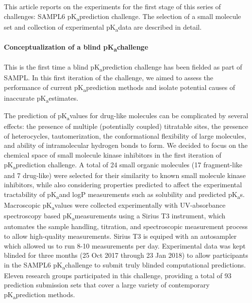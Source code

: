 \documentclass[9pt,lineno]{elife}
\newcommand{\pKa}{pK\textsubscript{a}}
\begin{document}
This article reports on the experiments for the first stage of this series of challenges: SAMPL6 \pKa prediction challenge. The selection of a small molecule set and collection of experimental \pKa data are described in detail.

\paragraph{Conceptualization of a blind \pKa challenge}

This is the first time a blind \pKa prediction challenge has been fielded as part of SAMPL. 
In this first iteration of the challenge, we aimed to assess the performance of current \pKa prediction methods and isolate potential causes of inaccurate \pKa estimates.

The prediction of \pKa values for drug-like molecules can be complicated by several effects: the presence of multiple (potentially coupled) titratable sites, the presence of heterocycles, tautomerization, the conformational flexibility of large molecules, and ability of intramolecular hydrogen bonds to form. 
We decided to focus on the chemical space of small molecule kinase inhibitors in the first iteration of \pKa prediction challenge. 
A total of 24 small organic molecules (17 fragment-like and 7 drug-like) were selected for their similarity to known small molecule kinase inhibitors, while also considering properties predicted to affect the experimental tractability of \pKa and logP measurements such as solubility and predicted \pKa s. 
Macroscopic \pKa values were collected experimentally with UV-absorbance spectroscopy based \pKa measurements using a Sirius T3 instrument, which automates the sample handling, titration, and spectroscopic measurement process to allow high-quality measurements. Sirius T3 is equiped with an autosampler which allowed us to run 8-10 measurements per day.
Experimental data was kept blinded for three months (25 Oct 2017 through 23 Jan 2018) to allow participants in the SAMPL6 \pKa challenge to submit truly blinded computational predictions. 
Eleven research groups participated in this challenge, providing a total of 93 prediction submission sets that cover a large variety of contemporary \pKa prediction methods. 
 
\end{document}
